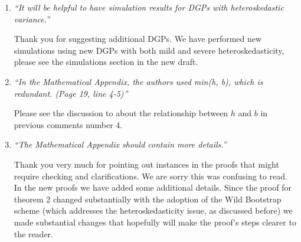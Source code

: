 \documentclass[12pt,fleqn]{article}
\begin{document}
\begin{enumerate}
\item \textit{``It will be helpful to have simulation results for DGPs with heteroskedastic variance.''}

 Thank you for suggesting additional DGPs. We have performed new simulations using new DGPs with both mild and severe heteroskedasticity, please see the simulations section in the new draft.

\item \textit{``In the Mathematical Appendix, the authors used min(h, b), which is redundant. (Page 19, line 4-5)''}

Please see the discussion to about the relationship between $h$ and $b$ in previous comments number 4.

\item \textit{``The Mathematical Appendix should contain more details.''}

Thank you very much for pointing out instances in the proofs that might require checking and clarifications. We are sorry this was confusing to read. In the new proofs we have added some additional details. Since the proof for theorem 2 changed substantially with the adoption of the Wild Bootstrap scheme (which addresses the heteroskedasticity issue, as discussed before) we made substantial changes that hopefully will make the proof's steps clearer to the reader. 

\end{enumerate}
\end{document}

